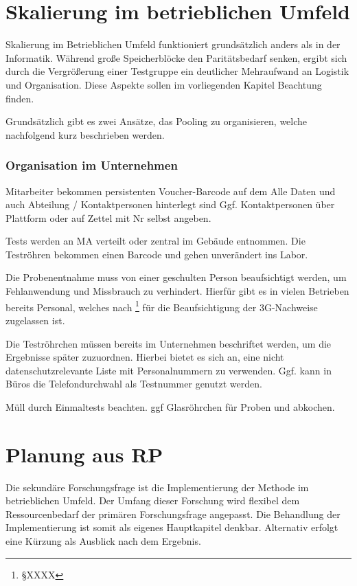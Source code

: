 \section{Skalierung im betrieblichen Umfeld}
Skalierung im Betrieblichen Umfeld funktioniert grundsätzlich anders als in der Informatik.
Während große Speicherblöcke den Paritätsbedarf senken, ergibt sich durch die Vergrößerung einer Testgruppe ein deutlicher Mehraufwand an Logistik und Organisation. 
Diese Aspekte sollen im vorliegenden Kapitel Beachtung finden.

Grundsätzlich gibt es zwei Ansätze, das Pooling zu organisieren, welche nachfolgend kurz beschrieben werden.


\subsubsection{Organisation im Unternehmen}
Mitarbeiter bekommen persistenten Voucher-Barcode auf dem Alle Daten und auch Abteilung / Kontaktpersonen hinterlegt sind
Ggf. Kontaktpersonen über Plattform oder auf Zettel mit Nr selbst angeben.

Tests werden an MA verteilt oder zentral im Gebäude entnommen.
Die Teströhren bekommen einen Barcode und gehen unverändert ins Labor.

Die Probenentnahme muss von einer geschulten Person beaufsichtigt werden, um Fehlanwendung und Missbrauch zu verhindert.
Hierfür gibt es in vielen Betrieben bereits Personal, welches nach \footnote{§XXXX}
für die Beaufsichtigung der 3G-Nachweise zugelassen ist.

Die Teströhrchen müssen bereits im Unternehmen beschriftet werden, um die Ergebnisse später zuzuordnen.
Hierbei bietet es sich an, eine nicht datenschutzrelevante Liste mit Personalnummern zu verwenden.
Ggf. kann in Büros die Telefondurchwahl als Testnummer genutzt werden.


Müll durch Einmaltests beachten. ggf Glasröhrchen für Proben und abkochen.
\cleardoublepage




\section{Planung aus RP}
Die sekundäre Forschungsfrage ist die Implementierung der Methode im betrieblichen Umfeld.
Der Umfang dieser Forschung wird flexibel dem Ressourcenbedarf der primären Forschungsfrage angepasst.
Die Behandlung der Implementierung ist somit als eigenes Hauptkapitel denkbar.
Alternativ erfolgt eine Kürzung als Ausblick nach dem Ergebnis.

